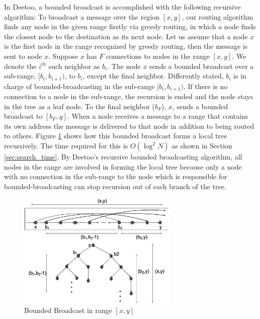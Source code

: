 \documentclass[9.5pt,journal,final,finalsubmission,twocolumn]{IEEEtran}
\begin{document}
In Deetoo, a bounded broadcast is accomplished with the following 
recursive algorithm:  
To broadcast a message over the region $[x, y]$, 
our routing algorithm finds any node in the given range firstly via greedy routing,
in which a node finds the closest node to the destination as its next node.
Let us assume that a node $x$ is the first node in the range recognized by greedy routing, 
then the message is sent to node $x$. 
Suppose $x$ has $F$ connections to nodes in the range $[x, y]$. 
We denote the $i^{th}$ such neighbor as $b_i$.
The node $x$ sends a bounded broadcast over a sub-range, 
$[b_i, b_{i+1})$, to $b_i$, except the final neighbor. 
Differently stated, $b_i$ is in charge of bounded-broadcasting 
in the sub-range $[b_i, b_{i+1})$. If there is no connection to a node in the sub-range, 
the recursion is ended and the node stays in the tree as a leaf node.
To the final
neighbor ($b_F$), $x$, sends a bounded broadcast to $[b_F, y]$.
When a node receives a message to a range that contains its own address
the message is delivered to that node in addition to being routed to others.
Figure \ref{fig:tree} shows how this bounded broadcast forms a local 
tree recursively. The time required for this is $O(\log^2 N)$ as 
shown in Section \ref{sec:search_time}.
By Deetoo's recursive bounded broadcasting algorithm, all nodes in the range 
are involved in forming the local tree because only a node with no connection 
in the sub-range to the node which is responsible for bounded-broadcasting 
can stop recursion out of each branch of the tree.

\begin{figure}
\centering
\includegraphics[width=3.0in]{tree}
\caption{Bounded Broadcast in range $[x, y]$} \label{fig:tree}
\end{figure}
\end{document}
